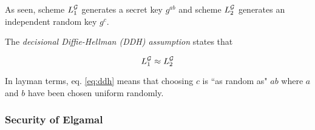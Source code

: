 As seen, scheme \( L_1^{\mathcal{G}} \) generates a secret key \( g^{ab} \) and scheme \( L_2^{\mathcal{G}} \) generates an independent random key \( g^c \).

The \textit{decisional Diffie-Hellman (DDH) assumption} states that

\begin{equation} \label{eq:ddh} 
    L_1^{\mathcal{G}} \approx L_2^{\mathcal{G}}
\end{equation}

In layman terms, eq. \ref{eq:ddh} means that choosing \( c \) is ``as random as" \( ab \) where \( a \) and \( b \) have been chosen uniform randomly.

\subsubsection{Security of Elgamal}
